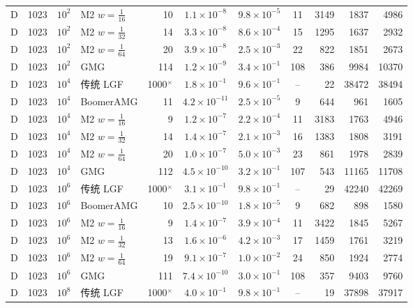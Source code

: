 \begin{longtable}{lrrlrcccrrr}
D & 1023 & $10^{2}$ & M2 $w{=}\frac1{16}$ & 10 & $1.1{\times}10^{-8}$ & $9.8{\times}10^{-5}$ & 11 & 3149 & 1837 & 4986 \\
D & 1023 & $10^{2}$ & M2 $w{=}\frac1{32}$ & 14 & $3.3{\times}10^{-8}$ & $8.6{\times}10^{-4}$ & 15 & 1295 & 1637 & 2932 \\
D & 1023 & $10^{2}$ & M2 $w{=}\frac1{64}$ & 20 & $3.9{\times}10^{-8}$ & $2.5{\times}10^{-3}$ & 22 & 822 & 1851 & 2673 \\
D & 1023 & $10^{2}$ & GMG & 114 & $1.2{\times}10^{-9}$ & $3.4{\times}10^{-1}$ & 108 & 386 & 9984 & 10370 \\
D & 1023 & $10^{4}$ & 传统 LGF & 1000$^\times$ & $1.8{\times}10^{-1}$ & $9.6{\times}10^{-1}$ & -- & 22 & 38472 & 38494 \\
D & 1023 & $10^{4}$ & BoomerAMG & 11 & $4.2{\times}10^{-11}$ & $2.5{\times}10^{-5}$ & 9 & 644 & 961 & 1605 \\
D & 1023 & $10^{4}$ & M2 $w{=}\frac1{16}$ & 9 & $1.2{\times}10^{-7}$ & $2.2{\times}10^{-4}$ & 11 & 3183 & 1763 & 4946 \\
D & 1023 & $10^{4}$ & M2 $w{=}\frac1{32}$ & 14 & $1.4{\times}10^{-7}$ & $2.1{\times}10^{-3}$ & 16 & 1383 & 1808 & 3191 \\
D & 1023 & $10^{4}$ & M2 $w{=}\frac1{64}$ & 20 & $1.0{\times}10^{-7}$ & $5.0{\times}10^{-3}$ & 23 & 861 & 1978 & 2839 \\
D & 1023 & $10^{4}$ & GMG & 112 & $4.5{\times}10^{-10}$ & $3.2{\times}10^{-1}$ & 107 & 543 & 11165 & 11708 \\
D & 1023 & $10^{6}$ & 传统 LGF & 1000$^\times$ & $3.1{\times}10^{-1}$ & $9.8{\times}10^{-1}$ & -- & 29 & 42240 & 42269 \\
D & 1023 & $10^{6}$ & BoomerAMG & 10 & $2.5{\times}10^{-10}$ & $1.8{\times}10^{-5}$ & 9 & 682 & 898 & 1580 \\
D & 1023 & $10^{6}$ & M2 $w{=}\frac1{16}$ & 9 & $1.4{\times}10^{-7}$ & $3.9{\times}10^{-4}$ & 11 & 3422 & 1845 & 5267 \\
D & 1023 & $10^{6}$ & M2 $w{=}\frac1{32}$ & 13 & $1.6{\times}10^{-6}$ & $4.2{\times}10^{-3}$ & 17 & 1459 & 1761 & 3219 \\
D & 1023 & $10^{6}$ & M2 $w{=}\frac1{64}$ & 19 & $9.1{\times}10^{-7}$ & $1.0{\times}10^{-2}$ & 24 & 850 & 1924 & 2774 \\
D & 1023 & $10^{6}$ & GMG & 111 & $7.4{\times}10^{-10}$ & $3.0{\times}10^{-1}$ & 108 & 357 & 9403 & 9760 \\
D & 1023 & $10^{8}$ & 传统 LGF & 1000$^\times$ & $4.0{\times}10^{-1}$ & $9.8{\times}10^{-1}$ & -- & 19 & 37898 & 37917 \\

\end{longtable}
